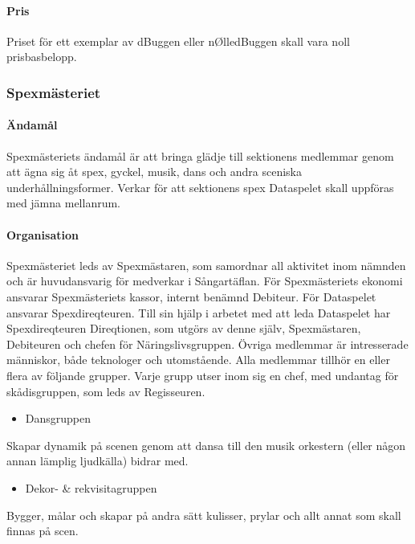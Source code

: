 \documentclass[a4paper,12pt]{article}
\begin{document}
\paragraph{Pris}

Priset för ett exemplar av dBuggen eller nØlledBuggen skall vara noll prisbasbelopp.

\subsubsection{Spexmästeriet}

\paragraph{Ändamål}

Spexmästeriets ändamål är att bringa glädje till sektionens medlemmar genom att ägna sig åt spex, gyckel, musik, dans och andra sceniska underhållningsformer. Verkar för att sektionens spex Dataspelet skall uppföras med jämna mellanrum.

\paragraph{Organisation}

Spexmästeriet leds av Spexmästaren, som samordnar all aktivitet inom nämnden och är huvudansvarig för medverkar i Sångartäflan. För Spexmästeriets ekonomi ansvarar Spexmästeriets kassor, internt benämnd Debiteur. För Dataspelet ansvarar Spexdireqteuren. Till sin hjälp i arbetet med att leda Dataspelet har Spexdireqteuren Direqtionen, som utgörs av denne själv, Spexmästaren, Debiteuren och chefen för Näringslivsgruppen. Övriga medlemmar är intresserade människor, både teknologer och utomstående. Alla medlemmar tillhör en eller flera av följande grupper. Varje grupp utser inom sig en chef, med undantag för skådisgruppen, som leds av Regisseuren.

\begin{itemize}
  \item Dansgruppen
\end{itemize}

Skapar dynamik på scenen genom att dansa till den musik orkestern (eller någon annan lämplig ljudkälla) bidrar med.

\begin{itemize}
  \item Dekor- \& rekvisitagruppen
\end{itemize}

Bygger, målar och skapar på andra sätt kulisser, prylar och allt annat som skall finnas på scen.
\end{document}
